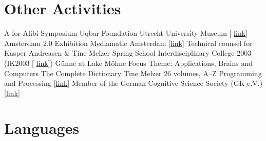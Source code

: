 \documentclass[11pt,a4paper]{moderncv}
\begin{document}
\section{Other Activities}
        {A for Alibi Symposium}
        {}
        {Uqbar Foundation}
        {Utrecht University Museum [%
        \href{http://www.sternbergpress.com/?pageId=1204}{link}]}
        {}	
        {Amsterdam 2.0 Exhibition}
        {}
        {Mediamatic}
        {Amsterdam [\href{http://www.mediamatic.net/artefact-9850-en.html}%
        {link}]}
        {Technical counsel for Kasper Andreasen \& Tine Melzer}
        {Spring School}
        {}
        {Interdisciplinary College 2003 (IK2003 [%
        \href{http://www.ik-guenne.de/html/ik2003.html}{link}])}
        {G\"{u}nne at Lake M\"{o}hne}
        {Focus Theme: Applications, Brains and Computers}
        {The Complete Dictionary}
        {}
        {Tine Melzer}
        {26 volumes, A--Z}
        {Programming and Processing
        [\href{http://www.tinemelzer.eu/works/the-complete-dictionary/}
        {link}]}
        {Member of the German Cognitive Science Society (GK e.V.)}
        {}
        {}
        {[\href{http://www.gk-ev.de}{link}]}
        {}
\closesection{}


\section{Languages}
\closesection{}

\end{document}
